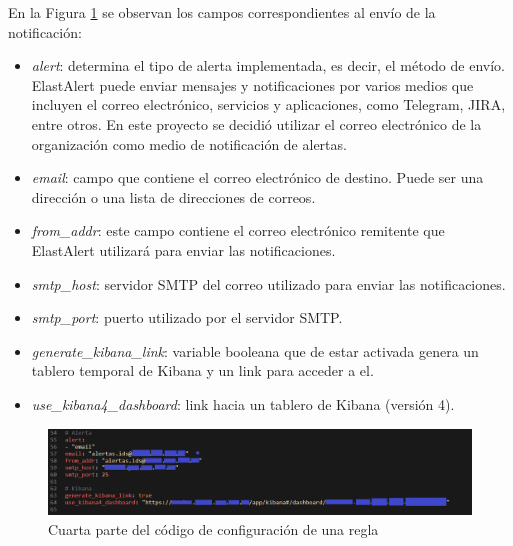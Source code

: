     \FloatBarrier
    En la Figura \ref{fig:iter2_4_codigo} se observan los campos correspondientes al envío de la notificación:
    \begin{itemize}
        \item \textit{alert}: determina el tipo de alerta implementada, es decir, el método de envío. ElastAlert puede enviar mensajes y notificaciones por varios medios que incluyen el correo electrónico, servicios y aplicaciones, como Telegram, JIRA, entre otros. En este proyecto se decidió utilizar el correo electrónico de la organización como medio de notificación de alertas.
        \item \textit{email}: campo que contiene el correo electrónico de destino. Puede ser una dirección o una lista de direcciones de correos.
        \item \textit{from\_addr}: este campo contiene el correo electrónico remitente que ElastAlert utilizará para enviar las notificaciones.
        \item \textit{smtp\_host}: servidor SMTP del correo utilizado para enviar las notificaciones.
        \item \textit{smtp\_port}: puerto utilizado por el servidor SMTP.
        \item \textit{generate\_kibana\_link}: variable booleana que de estar activada genera un tablero temporal de Kibana y un link para acceder a el.
        \item \textit{use\_kibana4\_dashboard}: link hacia un tablero de Kibana (versión 4).
    \end{itemize}
    \begin{figure}[H]
    \centering
        \includegraphics[width=1\textwidth]{./iteracion_2_imagenes/6-codigoAlerta4.png}
        \caption{Cuarta parte del código de configuración de una regla}
        \label{fig:iter2_4_codigo}
    \end{figure}
    \FloatBarrier
    
